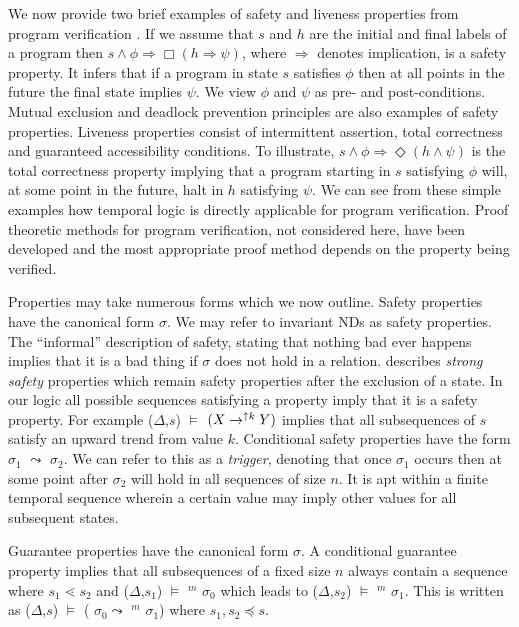\medskip

We now provide two brief examples of safety and liveness properties
from program verification \cite{eme90}. If we assume that $s$ and $h$
are the initial and final labels of a program then $s \wedge \phi
\Rightarrow \Box (h \Rightarrow \psi)$, where $\Rightarrow$ denotes
implication, is a safety property. It infers that if a program in state
$s$ satisfies $\phi$ then at all points in the future the final state
implies $\psi$. We view $\phi$ and $\psi$ as pre- and
post-conditions. Mutual exclusion and deadlock prevention principles are
also examples of safety properties.  Liveness properties consist of
intermittent assertion, total correctness and guaranteed accessibility
conditions. To illustrate, $s \wedge \phi \Rightarrow \Diamond (h
\wedge \psi)$ is the total correctness property implying that a
program starting in $s$ satisfying $\phi$ will, at some point in the
future, halt in  $h$ satisfying $\psi$. We can see from these simple
examples how temporal logic is directly applicable for program
verification. Proof theoretic methods for program verification, not
considered here, have been developed and the most appropriate proof
method depends on the property being verified.

\medskip
{}

Properties may take numerous forms which we now outline.
Safety properties have the canonical form  $\sigma$. We may
refer to invariant NDs as safety properties. The ``informal''
description of safety, stating that nothing bad ever happens implies
that it is a bad thing if $\sigma$ does not hold in a
relation. \cite{sis94} describes {\em strong safety} properties which
remain safety properties after the exclusion of a state. In our logic
all possible sequences satisfying a property imply that it is a safety
property.  For example ($\Delta$,$s$) $\models$  $(X \to^{\uparrow
k} Y)$ implies that all 
subsequences of $s$ satisfy an upward trend from value $k$.
Conditional safety properties have the form $\sigma_1$ $\leadsto$
 $\sigma_2$. We
can refer to this as a {\em trigger}, denoting that once $\sigma_1$
occurs then at some point after $\sigma_2$ will hold in all sequences
of size $n$. It is apt within a finite
temporal sequence wherein a certain value may imply other values for all
subsequent states.

\medskip
Guarantee properties have the canonical form  $\sigma$.
A conditional guarantee property implies that all subsequences of
a fixed size $n$ 
always contain a sequence where $s_1 \lessdot s_2$ and
($\Delta$,$s_1$) $\models$ \diam$^{m}$ $\sigma_0$ which leads to 
($\Delta$,$s_2$) $\models$ \diam$^{m}$ $\sigma_1$. This is written as
($\Delta$,$s$) $\models$  ( $\sigma_0 \leadsto$ \diam$^{m}$
$\sigma_1$) where $s_1,s_2 \preceq s$.


